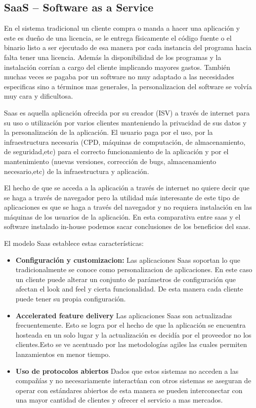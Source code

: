 \documentclass[12pt,a4paper]{article}
\begin{document}
\subsection{SaaS -- Software as a Service}
En el sistema tradicional un cliente compra o manda a hacer una aplicación y 
este es dueño de una licencia, se le entrega físicamente el código fuente o
el binario listo a ser ejecutado de esa manera por cada instancia del 
programa hacia falta tener una licencia. Además la disponibilidad de los 
programas y la instalación corrían a cargo del cliente implicando mayores 
gastos. También muchas veces se pagaba por un software no muy adaptado a las 
necesidades especificas sino a términos mas generales, la personalizacion del 
software se volvía muy cara y dificultosa.\par
Saas es aquella aplicación ofrecida por su creador (ISV) a través de internet 
para su uso o utilización por varios clientes manteniendo la privacidad de 
sus datos y la personalización de la aplicación. El usuario paga por el uso, 
por la infraestructura necesaria (CPD, máquinas de computación, de 
almacenamiento, de seguridad,etc) para el correcto funcionamiento de la 
aplicación y por el mantenimiento (nuevas versiones, corrección de bugs, 
almacenamiento necesario,etc) de la infraestructura y aplicación.\par
El hecho de que se acceda a la aplicación a través de internet no quiere 
decir que se haga a través de navegador pero la utilidad más interesante de 
este tipo de aplicaciones es que se haga a través del navegador y no requiera 
instalación en las máquinas de los usuarios de la aplicación. En esta 
comparativa entre saas y el software instalado in-house  podemos sacar 
conclusiones de los beneficios del saas.\par
El modelo Saas establece estas características:
\begin{itemize}

\item \textbf{Configuración y customizacion: }
Las aplicaciones Saas soportan lo que tradicionalmente se conoce como 
personalizacion de aplicaciones. En este caso un cliente puede alterar un 
conjunto de parámetros de configuración que afectan el look and feel y cierta 
funcionalidad. De esta manera cada cliente puede tener su propia 
configuración.

\item \textbf{Accelerated feature delivery}
Las aplicaciones Saas son actualizadas frecuentemente. Esto se logra por el 
hecho de que la aplicación se encuentra hosteada en un solo lugar y la 
actualización es decidía por el proveedor no los clientes.Esto se ve 
acentuado por las metodologías agiles las cuales permiten lanzamientos en 
menor tiempo. 

\item \textbf{Uso de protocolos abiertos}
Dados que estos sistemas no acceden a las compañías y no necesariamente 
interactúan con otros sistemas se aseguran de operar con estándares abiertos
de esta manera se pueden interconectar con una mayor cantidad de clientes y 
ofrecer el servicio a mas mercados.

\end{itemize}
\end{document}
